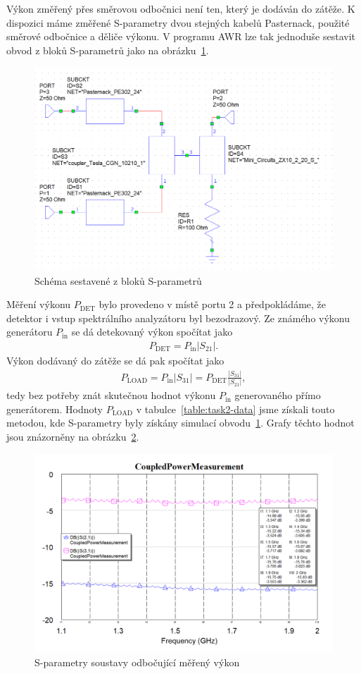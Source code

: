 \documentclass[11pt,a4paper]{article}
\begin{document}
Výkon změřený přes směrovou odbočnici není ten, který je dodáván do zátěže. K dispozici máme změřené S-parametry dvou stejných kabelů Pasternack, použité směrové odbočnice a děliče výkonu. V programu AWR lze tak jednoduše sestavit obvod z bloků S-parametrů jako na obrázku~\ref{fig:task2-sparametry}.
\begin{figure}[!ht]
    \centering
    \includegraphics[width=.8\textwidth]{src/task2-sparametry.png}
    \caption{\label{fig:task2-sparametry}Schéma sestavené z bloků S-parametrů}
\end{figure}
Měření výkonu $P_{\mathrm{DET}}$ bylo provedeno v místě portu 2 a předpokládáme, že detektor i vstup spektrálního analyzátoru byl bezodrazový. Ze známého výkonu generátoru $P_{\mathrm{in}}$ se dá detekovaný výkon spočítat jako
\begin{align}
    P_{\mathrm{DET}} = P_{\mathrm{in}} \left|S_{21}\right|.
\end{align}
Výkon dodávaný do zátěže se dá pak spočítat jako
\begin{align}
    P_{\mathrm{LOAD}} = P_{\mathrm{in}} \left|S_{31}\right| = P_{\mathrm{DET}} \frac{\left|S_{31}\right|}{\left|S_{21}\right|},
\end{align}
tedy bez potřeby znát skutečnou hodnot výkonu $P_{\mathrm{in}}$ generovaného přímo generátorem. Hodnoty $P_{\mathrm{LOAD}}$ v tabulce~\ref{table:task2-data} jsme získali touto metodou, kde S-parametry byly získány simulací obvodu~\ref{fig:task2-sparametry}. Grafy těchto hodnot jsou znázorněny na obrázku~\ref{fig:task2-sparameter-data}.
\begin{figure}[!ht]
    \centering
    \includegraphics[width=.8\textwidth]{src/task2-sparameter_data.png}
    \caption{\label{fig:task2-sparameter-data}S-parametry soustavy odbočující měřený výkon}
\end{figure}
\end{document}
